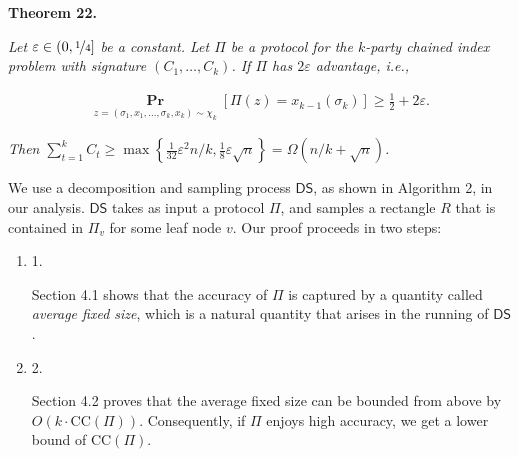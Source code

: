 \documentclass[10pt,a4paper]{article}
\begin{document}


\par\medskip\noindent\textbf{
\textbf{Theorem 22}\textbf{.}
}\par



\emph{Let $\varepsilon\in(0,\nicefrac{{1}}{{4}}]$ be a constant.
Let $\Pi$ be a protocol for the $k$-party chained index problem with signature $(C_{1},\dots,C_{k})$.
If $\Pi$ has $2\varepsilon$ advantage, i.e.,}\par


\[\begin{gathered}
\operatorname*{\mathbf{Pr}}_{z=(\sigma_{1},x_{1},\dots,\sigma_{k},x_{k})\sim\chi_{k}}\left[\Pi(z)=x_{k-1}(\sigma_{k})\right]\geq\frac{1}{2}+2\varepsilon.
\end{gathered}\]


\emph{Then $\sum_{t=1}^{k}C_{t}\geq\max\left\{\frac{1}{32}\varepsilon^{2}n/k,\frac{1}{8}\varepsilon\sqrt{n}\right\}=\Omega(n/k+\sqrt{n})$.}\par







We use a decomposition and sampling process $\mathsf{DS}$, as shown in Algorithm 2, in our analysis.
$\mathsf{DS}$ takes as input a protocol $\Pi$,
and samples a rectangle $R$ that is contained in $\Pi_{v}$ for some leaf node $v$.
Our proof proceeds in two steps:\par


\begin{enumerate}


\item[] 
1. 


Section 4.1 shows that the accuracy of $\Pi$ is captured by a quantity called \emph{average fixed size}, which is a natural quantity that arises in the running of $\mathsf{DS}$.\par





\item[] 
2. 


Section 4.2 proves that the average fixed size can be bounded from above by $O(k\cdot\mathrm{CC}(\Pi))$. Consequently, if $\Pi$ enjoys high accuracy, we get a lower bound of $\mathrm{CC}(\Pi)$.\par





\end{enumerate}
\end{document}
